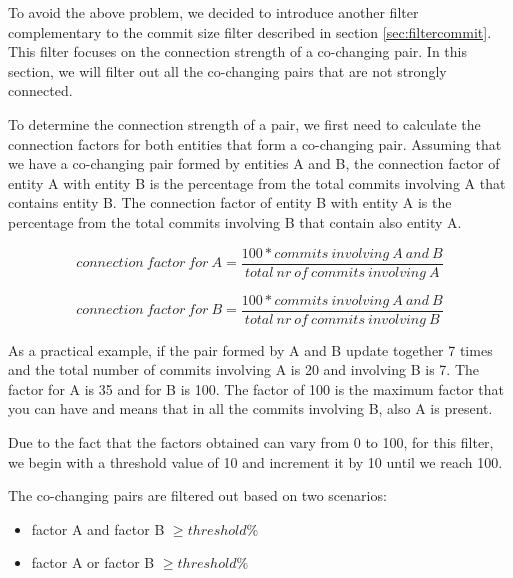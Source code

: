 \documentclass[12pt, a4paper, twoside]{report}
\begin{document}
To avoid the above problem, we decided to introduce another filter complementary to the commit size filter described in section \ref{sec:filtercommit}.
This filter focuses on the connection strength of a co-changing pair. In this section, we will filter out all the co-changing pairs that are not strongly connected.

To determine the connection strength of a pair, we first need to calculate the connection factors for both entities that form a co-changing pair.
Assuming that we have a co-changing pair formed by entities A and B, the connection factor of entity A with entity B is the percentage from the total commits involving A that contains entity B. The connection factor of entity B with entity A is the percentage from the total commits involving B that contain also entity A.

\begin{equation}
 connection\ factor\ for\ A = \frac{100 * commits\ involving\ A\ and\ B}{total\ nr\ of\ commits\ involving\ A}
\end{equation}

\begin{equation}
 connection\ factor\ for\ B = \frac{100 * commits\ involving\ A\ and\ B}{total\ nr\ of\ commits\ involving\ B}
\end{equation}

As a practical example, if the pair formed by A and B update together 7 times and the total number of commits involving A is 20 and involving B is 7. The factor for A is 35 and for B is 100. The factor of 100 is the maximum factor that you can have and means that in all the commits involving B, also A is present.

Due to the fact that the factors obtained can vary from 0 to 100, for this filter, we begin with a threshold value of 10 and increment it by 10 until we reach 100. 

The co-changing pairs are filtered out based on two scenarios:
\begin{itemize}
	\item factor A and factor B $\geq threshold \%$ 
	\item factor A or factor B $\geq threshold \%$ 
\end{itemize}
\end{document}
